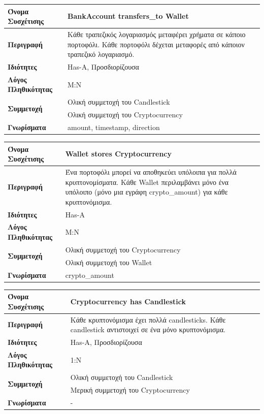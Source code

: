 \vspace{1cm}

\noindent
\begin{tabular}{|p{4cm}|p{10cm}|}
\hline
\textbf{Όνομα Συσχέτισης} & BankAccount transfers\_to Wallet \\ \hline
\textbf{Περιγραφή} & Κάθε τραπεζικός λογαριασμός μεταφέρει χρήματα σε κάποιο πορτοφόλι. Κάθε πορτοφόλι δέχεται μεταφορές από κάποιον τραπεζικό λογαριασμό.\\ \hline
\textbf{Ιδιότητες} & Has-A, Προσδιορίζουσα \\ \hline
\textbf{Λόγος Πληθικότητας} & M:N \\ \hline
\multirow{2}{4cm}{\textbf{Συμμετοχή}}
& Ολική συμμετοχή του Candlestick \\ \cline{2-2}
& Ολική συμμετοχή του Cryptocurrency \\ \hline
\textbf{Γνωρίσματα} & amount, timestamp, direction \\ \hline
\end{tabular}


\vspace{1cm}

\noindent
\begin{tabular}{|p{4cm}|p{10cm}|}
\hline
\textbf{Όνομα Συσχέτισης} & Wallet stores Cryptocurrency \\ \hline
\textbf{Περιγραφή} & Ένα πορτοφόλι μπορεί να αποθηκεύει υπόλοιπα για πολλά κρυπτονομίσματα. Κάθε 
Wallet περιλαμβάνει μόνο ένα υπόλοιπο (μόνο μια εγράφη crypto\_amount) για κάθε κρυπτονόμισμα. \\ \hline
\textbf{Ιδιότητες} & Has-A \\ \hline
\textbf{Λόγος Πληθικότητας} & M:N \\ \hline
\multirow{2}{4cm}{\textbf{Συμμετοχή}} 
& Ολική συμμετοχή του Cryptocurrency \\
\cline{2-2}
& Ολική συμμετοχή του Wallet \\
\hline
\textbf{Γνωρίσματα} & crypto\_amount \\ \hline
\end{tabular}

\vspace{1cm}


\noindent
\begin{tabular}{|p{4cm}|p{10cm}|}
\hline
\textbf{Όνομα Συσχέτισης} & Cryptocurrency has Candlestick \\ \hline
\textbf{Περιγραφή} & Κάθε κρυπτονόμισμα έχει πολλά candlesticks. 
Κάθε candlestick αντιστοιχεί σε ένα μόνο κρυπτονόμισμα. \\ \hline
\textbf{Ιδιότητες} & Has-A, Προσδιορίζουσα \\ \hline
\textbf{Λόγος Πληθικότητας} & 1:N \\ \hline
\multirow{2}{4cm}{\textbf{Συμμετοχή}}
& Ολική συμμετοχή του Candlestick \\ \cline{2-2}
& Μερική συμμετοχή του Cryptocurrency \\ \hline
\textbf{Γνωρίσματα} & - \\ \hline
\end{tabular}

